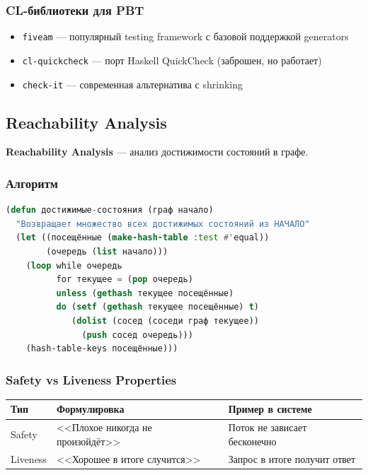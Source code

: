 \documentclass[12pt, a4paper, twoside]{article}
\begin{document}
\subsubsection{CL-библиотеки для PBT}

\begin{itemize}[leftmargin=1.5em]
  \item \texttt{fiveam} --- популярный testing framework с базовой поддержкой generators
  \item \texttt{cl-quickcheck} --- порт Haskell QuickCheck (заброшен, но работает)
  \item \texttt{check-it} --- современная альтернатива с shrinking
\end{itemize}

\subsection{Reachability Analysis}

\textbf{Reachability Analysis} --- анализ достижимости состояний в графе.

\subsubsection{Алгоритм}

\begin{lstlisting}[language=CommonLisp,caption={BFS для анализа достижимости}]
(defun достижимые-состояния (граф начало)
  "Возвращает множество всех достижимых состояний из НАЧАЛО"
  (let ((посещённые (make-hash-table :test #'equal))
        (очередь (list начало)))
    (loop while очередь
          for текущее = (pop очередь)
          unless (gethash текущее посещённые)
          do (setf (gethash текущее посещённые) t)
             (dolist (сосед (соседи граф текущее))
               (push сосед очередь)))
    (hash-table-keys посещённые)))
\end{lstlisting}

\subsubsection{Safety vs Liveness Properties}

\begin{center}
\begin{tabularx}{\textwidth}{lLL}
  \toprule
  \textbf{Тип} & \textbf{Формулировка} & \textbf{Пример в системе} \\
  \midrule
  Safety   & <<Плохое никогда не произойдёт>> & Поток не зависает бесконечно \\
  Liveness & <<Хорошее в итоге случится>>     & Запрос в итоге получит ответ \\
  \bottomrule
\end{tabularx}
\end{center}
\end{document}
